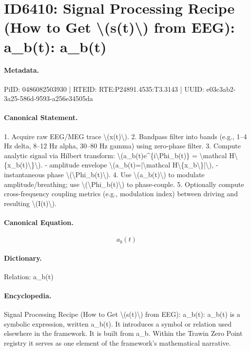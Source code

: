 \section*{ID6410: Signal Processing Recipe (How to Get \textbackslash{}(s(t)\textbackslash{}) from EEG): a\_b(t): a\_b(t)}
\paragraph{Metadata.}
PiID: 0486082503930 | RTEID: RTE:P24891.4535:T3.3143 | UUID: e03c3ab2-3a25-586d-9593-a256e34505da

\paragraph{Canonical Statement.}
1. Acquire raw EEG/MEG trace \textbackslash{}(x(t)\textbackslash{}). 2. Bandpass filter into bands (e.g., 1–4 Hz delta, 8–12 Hz alpha, 30–80 Hz gamma) using zero-phase filter. 3. Compute analytic signal via Hilbert transform: \textbackslash{}(a\_b(t)e\textasciicircum{}\{i\textbackslash{}Phi\_b(t)\} = \textbackslash{}mathcal H\textbackslash{}\{x\_b(t)\textbackslash{}\}\textbackslash{}). - amplitude envelope \textbackslash{}(a\_b(t)=|\textbackslash{}mathcal H\textbackslash{}\{x\_b\textbackslash{}\}|\textbackslash{}), - instantaneous phase \textbackslash{}(\textbackslash{}Phi\_b(t)\textbackslash{}). 4. Use \textbackslash{}(a\_b(t)\textbackslash{}) to modulate amplitude/breathing; use \textbackslash{}(\textbackslash{}Phi\_b(t)\textbackslash{}) to phase-couple. 5. Optionally compute cross-frequency coupling metrics (e.g., modulation index) between driving and resulting \textbackslash{}(I(t)\textbackslash{}).

\paragraph{Canonical Equation.}
\[
a_b(t)
\]

\paragraph{Dictionary.}
Relation: a\_b(t)

\paragraph{Encyclopedia.}
Signal Processing Recipe (How to Get \textbackslash{}(s(t)\textbackslash{}) from EEG): a\_b(t): a\_b(t) is a symbolic expression, written a\_b(t). It introduces a symbol or relation used elsewhere in the framework. It is built from a\_b. Within the Trawin Zero Point registry it serves as one element of the framework's mathematical narrative.

